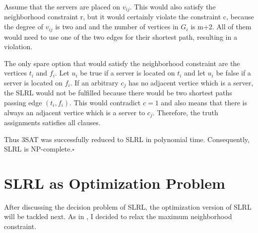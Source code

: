 \documentclass [12pt]{article}
\begin{document}
  \noindent
  Assume that the servers are placed on $v_{ij}$. This would also satisfy the neighborhood 
      constraint r, but it would certainly violate the constraint c, because the degree of $v_{ij}$ is two and
      and the number of vertices in $G_i$ is m+2. All of them would need to use one of the two edges for their shortest path,
    resulting in a violation.
  \medskip

  \noindent
  The only spare option that would satisfy the neighborhood constraint 
      are the vertices $t_i$ and $f_i$. Let $u_i$ be true if a server is located on
      $t_i$ and let $u_i$ be false if a server is located on $f_i$.  
      If an arbitrary $c_j$ has no adjacent vertice which is a server,
      the SLRL would not be fulfilled because there would be two shortest paths passing edge
      $(t_i,f_i)$. This would contradict $c = 1$ and also means that there is always an adjacent vertice which is a server to $c_j$.
      Therefore, the truth assignments satisfies all clauses.
  \medskip

  \noindent
Thus 3SAT was successfully reduced to SLRL in polynomial time.
Consequently, SLRL is NP-complete.$\square$

\section{SLRL as Optimization Problem}

After discussing the decision problem of SLRL, the optimization version
of SLRL will be tackled next. As in \cite{mirrorserver}, I decided to relax the maximum 
neighborhood constraint.
\end{document}
